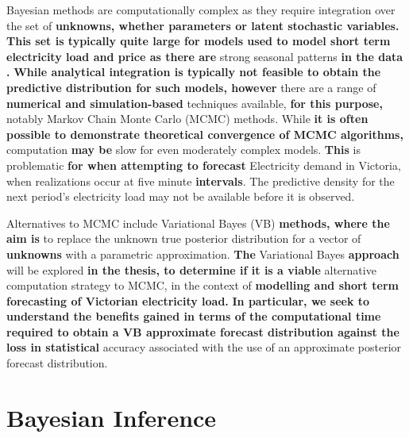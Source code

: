 \documentclass[12pt,a4paper]{article}%
\numberwithin{equation}{section}
\begin{document}
Bayesian methods are computationally complex as they require integration over the set of {\bf unknowns, whether parameters or latent stochastic variables. This set is typically quite large for models used to model short term electricity load and price as there are} strong seasonal patterns {\bf in the data \citep{Taylor2003}.} {\bf While analytical integration is typically not feasible to obtain the predictive distribution for such models, however} there are a range of {\bf numerical and simulation-based} techniques available, {\bf for this purpose,} notably Markov Chain Monte Carlo (MCMC) methods. While {\bf it is often possible to demonstrate theoretical convergence of MCMC algorithms,} computation {\bf may be} slow for even moderately complex models. {\bf This} is problematic {\bf for when attempting to forecast} Electricity demand 
in Victoria, {when realizations occur at} five minute {\bf intervals}. The predictive density for the next period's electricity load may not be available before it is observed.


Alternatives to MCMC include Variational Bayes (VB) {\bf methods, where the aim is} to replace the unknown true posterior distribution for a vector of {\bf unknowns}
with a parametric approximation. {\bf The} Variational Bayes {\bf approach} will be explored {\bf in the thesis, to determine if it is a viable} alternative computation strategy to MCMC,
in the context of {\bf modelling and short term forecasting of Victorian electricity load.}
{\bf In particular, we seek to understand the benefits gained in terms of the computational time required to obtain a VB approximate forecast distribution against the loss in statistical} 
accuracy associated with the use of an {approximate posterior forecast distribution.} 
%


\section{Bayesian Inference}
\end{document}
